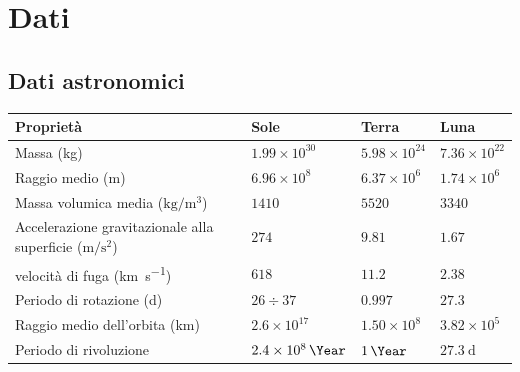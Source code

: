 \chapter{Dati}
\section{Dati astronomici}
\begin{tabular}{p{6.8cm}lll}
    \toprule
    Proprietà                                                                    & Sole                 & Terra             & Luna   \\
    \midrule
    Massa (\si{\kilogram})                                                       & $1.99\times 10^{30}$ &
    $5.98\times 10^{24}$                                                         & $7.36\times
    10^{22}$                                                                                                                         \\
    Raggio medio (\si{\meter})                                                   & $6.96\times 10^8$    & $6.37\times
    10^6$                                                                        & $1.74\times
    10^6$                                                                                                                            \\
    Massa volumica media ($\si{\kilogram\per\meter^3}$)                             & $1410$               & $5520$            & $3340$ \\
    Accelerazione gravitazionale alla superficie ($\si{\meter\per\second\squared}$) & $274$                & $9.81$            & $1.67$ \\
    velocità di fuga (\si{\kilo\meter\per\second})                               & $618$                & $11.2$            & $2.38$ \\
    Periodo di rotazione (\si{\day})                                             & $26\div37$           & $0.997$           & $27.3$ \\
    Raggio medio dell'orbita (\si{\kilo\meter})                                  & $2.6\times
    10^{17}$                                                                     & $1.50\times 10^8$    & $3.82\times 10^5$          \\
    Periodo di rivoluzione                                                       & $\SI{2.4E8}{\Year}$  &
    $\SI{1}{\Year}$                                                              & $\SI{27.3}{\day}$                                 \\
    \bottomrule
\end{tabular}

